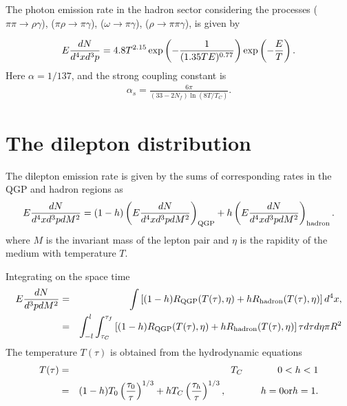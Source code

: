  The photon emission rate in the hadron sector considering the 
processes 
($\pi\pi\rightarrow \rho\gamma$),
($\pi\rho \rightarrow \pi\gamma$),
($\omega \rightarrow \pi\gamma$),
($\rho \rightarrow \pi\pi\gamma$),
is given by 

\begin{eqnarray}\label{}
E {dN \over d^4x d^3p} = 4.8 T^{2.15}  
      \exp\left(-\frac{1}{(1.35TE)^{0.77}}\right)
                \exp\left(-\frac{E}{T}\right).
\end{eqnarray}
 Here $\alpha=1/137$, and the strong coupling constant is 
\begin{eqnarray}\label{}
\alpha_s= \frac{6\pi}{(33-2N_f) \ln(8T/T_C)}.
\end{eqnarray}

\begin{figure}
\centerline{}
\caption{}
\label{photon}
\end{figure}

\begin{figure}
\centerline{}
\caption{}
\label{photon}
\end{figure}



\section{The dilepton distribution}
  The dilepton emission rate is given by the sums of corresponding 
rates in the QGP and hadron regions as 
\begin{eqnarray}\label{}
E {dN \over d^4x d^3p dM^2} = 
 (1-h) \left(E {dN \over d^4x d^3p dM^2}\right)_{\rm QGP} +
  h  \left(E {dN \over d^4x d^3p dM^2}\right)_{\rm hadron}.
\end{eqnarray}
where $M$ is the invariant mass of the lepton pair and $\eta$ is the 
rapidity of the medium with temperature $T$.

Integrating on the space time
\begin{eqnarray}\label{}
E {dN \over d^3p dM^2} &=& \int \left[(1-h) R_{\rm QGP} (T(\tau),\eta)+ 
     h  R_{\rm hadron}(T(\tau),\eta) \right] d^4 x, \nonumber \\
   &=& \int_{-l}^{l} \int_{\tau_C}^{\tau_f}
      \left[(1-h) R_{\rm QGP}(T(\tau),\eta) 
   + h  R_{\rm hadron}(T(\tau),\eta) \right]\tau d\tau d\eta \pi R^2
\end{eqnarray}
The temperature $T(\tau)$ is obtained from the hydrodynamic equations
\begin{eqnarray}\label{}
T(\tau)  &=& T_C  \hspace{.5in} 0 < h < 1   \nonumber \\
      &=& (1-h) T_0 \left({\tau_0 \over \tau}\right)^{1/3}
        + h T_C \left({\tau_h \over \tau}\right)^{1/3},
           \hspace{.5in} h=0 {\rm or}  h = 1.
\end{eqnarray}

